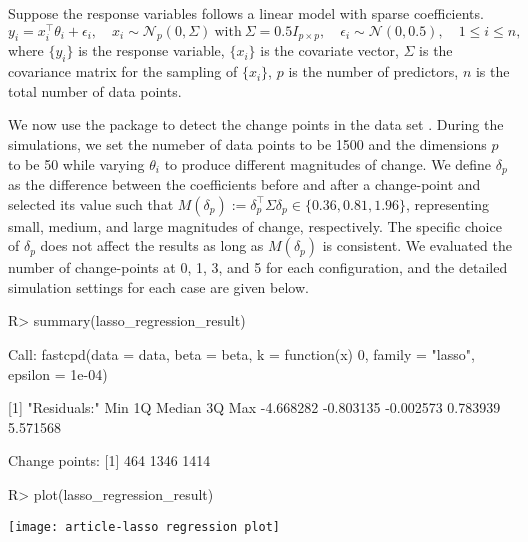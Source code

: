 \documentclass[article]{jss}
\begin{document}
Suppose the response variables follows a linear model with sparse coefficients.
%
\begin{equation} \label{eq:logistic_regression}
y_i = x_i^\top \theta_i + \epsilon_i,
\quad x_i \sim \mathcal{N}_p(0, \Sigma)\ \mathrm{with}\ \Sigma =
0.5I_{p \times p}, \quad \epsilon_i \sim \mathcal{N}(0, 0.5), \quad 1 \le i \le n,
\end{equation}
%
where $\{y_i\}$ is the response variable, $\{x_i\}$ is the covariate vector,
$\Sigma$ is the covariance matrix for the sampling of $\{x_i\}$, $p$ is the
number of predictors, $n$ is the total number of data points.

We now use the  package to detect the change points in the data set
. During the simulations, we set the numeber of data points to be
1500 and the dimensions $p$ to be 50 while varying $\theta_i$
to produce different magnitudes of change. We define $\delta_p$ as the difference
between the coefficients before and after a change-point and selected its value
such that $M(\delta_p):=\delta_p^\top \Sigma \delta_p \in \{0.36, 0.81, 1.96\}$,
representing small, medium, and large magnitudes of change, respectively. The
specific choice of $\delta_p$ does not affect the results as long as $M(\delta_p)$
is consistent. We evaluated the number of change-points at 0, 1, 3, and 5 for
each configuration, and the detailed simulation settings for each case are given
below.
%
%

\begin{Schunk}
\begin{Sinput}
R> summary(lasso_regression_result)
\end{Sinput}
\begin{Soutput}
Call:
fastcpd(data = data, beta = beta, k = function(x) 0, family = "lasso", 
    epsilon = 1e-04)

[1] "Residuals:"
      Min        1Q    Median        3Q       Max 
-4.668282 -0.803135 -0.002573  0.783939  5.571568 

Change points:
[1]  464 1346 1414
\end{Soutput}
\begin{Sinput}
R> plot(lasso_regression_result)
\end{Sinput}
\end{Schunk}
\texttt{[image: article-lasso regression plot]}
\end{document}
